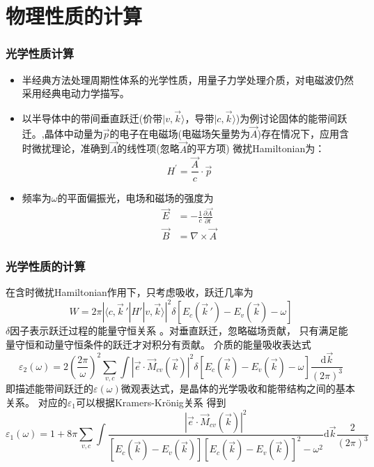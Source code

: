 \section{物理性质的计算}
\frame
{
\frametitle{光学性质计算}
\begin{itemize}
\setlength{\itemsep}{10pt}
	\item 半经典方法处理周期性体系的光学性质，用量子力学处理介质，对电磁波仍然采用经典电动力学描写。
	\item 以半导体中的带间垂直跃迁(价带$|v,\vec k\rangle$，导带$|c,\vec k\rangle$)为例讨论固体的能带间跃迁。,晶体中动量为$\vec p$的电子在电磁场(电磁场矢量势为$\vec A$)存在情况下，应用含时微扰理论，准确到$\vec A$的线性项(忽略$\vec A$的平方项)
微扰\textrm{Hamiltonian}为：
\begin{displaymath}
  H^{\prime}=\dfrac{\vec A}c\cdot\vec p
  \label{eq:optic-25}
\end{displaymath}
	\item 频率为$\omega$的平面偏振光，电场和磁场的强度为
\begin{displaymath}
\begin{aligned}
    \vec E&=-\frac1c\frac{\partial\vec A}{\partial t}\\
    \vec B&=\nabla\times\vec A
  \end{aligned}%
  \label{eq:optic-26}
\end{displaymath}
\end{itemize}
}
\frame
{
\frametitle{光学性质的计算}
在含时微扰\textrm{Hamiltonian}作用下，只考虑吸收，跃迁几率为
\begin{displaymath}
  W=2\pi|\langle c,\vec k\,'|H'|v,\vec k\rangle|^2\delta[E_c(\vec k\,')-E_v(\vec k)-\omega]
  \label{eq:optic-27}
\end{displaymath}
$\delta$因子表示跃迁过程的能量守恒关系%
。对垂直跃迁，忽略磁场贡献，%
只有满足能量守恒和动量守恒条件的跃迁才对积分有贡献。%
介质的能量吸收表达式
\begin{displaymath}
  \varepsilon_2(\omega)=2\left(\frac{2\pi}{\omega}\right)^2\sum_{v,c}\int|\vec e\cdot\vec M_{cv}(\vec k)|^2\delta[E_c(\vec k)-E_v(\vec k)-\omega]\frac{\textrm{d}\vec k}{(2\pi)^3}
  \label{eq:optic-32}
\end{displaymath}
即描述能带间跃迁的$\varepsilon(\omega)$微观表达式，是晶体的光学吸收和能带结构之间的基本关系。
对应的$\varepsilon_1$可以根据\textrm{Kramers-Kr\"onig}关系%
得到
\footnotesize{\begin{displaymath}
  \varepsilon_1(\omega)=1+8\pi\sum_{v,c}\int\frac{|\vec e\cdot\vec M_{cv}(\vec k)|^2}{[E_c(\vec k)-E_v(\vec k)][E_c(\vec k)-E_v(\vec k)]^2-\omega^2}\textrm{d}\vec k\frac2{(2\pi)^3}
  \label{eq:optic-35}
\end{displaymath}}
}
